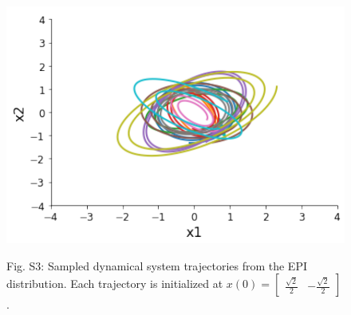 \documentclass[11pt]{article}
\begin{document}
\begin{figure}
\begin{center}
\includegraphics[scale=0.5]{figures/figS4/figS4.pdf}
\end{center}
\begin{flushleft}
Fig. S3: Sampled dynamical system trajectories from the EPI distribution.  Each trajectory is initialized at $x(0) = \begin{bmatrix} \frac{\sqrt{2}}{2} & -\frac{\sqrt{2}}{2} \end{bmatrix}$.
\end{flushleft}
\end{figure}
\end{document}
